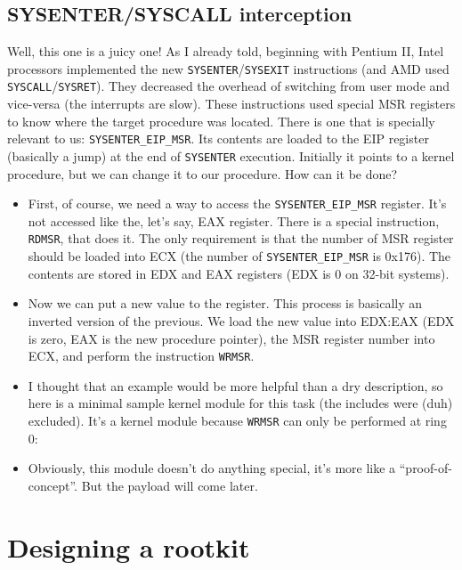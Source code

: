 \documentclass[12pt]{article}
\begin{document}
  \subsection{SYSENTER/SYSCALL interception}
  Well, this one is a juicy one! As I already told, beginning with Pentium II,
  Intel processors implemented the new \verb!SYSENTER!/\verb!SYSEXIT!
  instructions (and AMD used \verb!SYSCALL!/\verb!SYSRET!). They decreased the
  overhead of switching from user mode and vice-versa (the interrupts are
  slow). These instructions used special MSR registers to know where the
  target procedure was located. There is one that is specially relevant to us:
  \verb!SYSENTER_EIP_MSR!. Its contents are loaded to the EIP register
  (basically a jump) at the end of \verb!SYSENTER! execution. Initially it
  points to a kernel procedure, but we can change it to our procedure. How can
  it be done?
  \begin{itemize}
    \item First, of course, we need a way to access the
      \verb!SYSENTER_EIP_MSR! register. It's not accessed like the, let's say,
      EAX register. There is a special instruction, \verb!RDMSR!, that does
      it. The only requirement is that the number of MSR register should be
      loaded into ECX (the number of \verb!SYSENTER_EIP_MSR! is 0x176). The
      contents are stored in EDX and EAX registers (EDX is 0 on 32-bit
      systems).
      
    \item Now we can put a new value to the register. This process is
      basically an inverted version of the previous. We load the new value
      into EDX:EAX (EDX is zero, EAX is the new procedure pointer), the MSR
      register number into ECX, and perform the instruction \verb!WRMSR!.
  
    \item I thought that an example would be more helpful than a dry
      description, so here is a minimal sample kernel module for this task
      (the includes were (duh) excluded). It's a kernel module because
      \verb!WRMSR!  can only be performed at ring 0: 
      
    \item Obviously, this module doesn't do anything special, it's more like a
      ``proof-of-concept''. But the payload will come later.
  \end{itemize}

  \section{Designing a rootkit}
  
\end{document}
